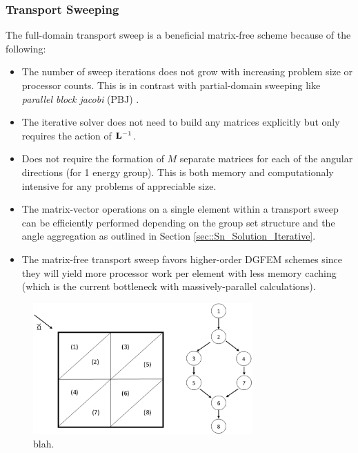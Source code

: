 \subsubsection{Transport Sweeping}
\label{sec::Sn_Solution_Spatial_Sweeping}

The full-domain transport sweep is a beneficial matrix-free scheme because of the following:

\begin{itemize}
\item The number of sweep iterations does not grow with increasing problem size or processor counts. This is in contrast with partial-domain sweeping like {\em parallel block jacobi} (PBJ) \cite{zerr2011solution}.
\item The iterative solver does not need to build any matrices explicitly but only requires the action of ${\bf L}^{-1}$.
\item Does not require the formation of $M$ separate matrices for each of the angular directions (for 1 energy group). This is both memory and computationaly intensive for any problems of appreciable size.
\item The matrix-vector operations on a single element within a transport sweep can be efficiently performed depending on the group set structure and the angle aggregation as outlined in Section \ref{sec::Sn_Solution_Iterative}.
\item The matrix-free transport sweep favors higher-order DGFEM schemes since they will yield more processor work per element with less memory caching (which is the current bottleneck with massively-parallel calculations).
\end{itemize}

\begin{figure}
\centering
\includegraphics[width=0.75\textwidth]{figures/sec_Sn/triangle_graph_nocycle.eps}
\caption[blah]{blah.}
\label{fig::Sn_Solution_Spatial_Sweeping_sweepNOcycle}
\end{figure}

